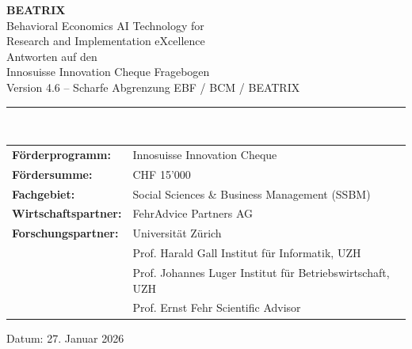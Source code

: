 \documentclass[11pt,a4paper]{article}
\begin{document}

\begin{titlepage}
\centering
\vspace*{2cm}

{\Huge\bfseries\color{fehrblue} BEATRIX}\\[0.5cm]
{\Large Behavioral Economics AI Technology for\\Research and Implementation eXcellence}\\[2cm]

{\LARGE Antworten auf den\\Innosuisse Innovation Cheque Fragebogen}\\[1cm]

{\large Version 4.6 -- Scharfe Abgrenzung EBF / BCM / BEATRIX}\\[2cm]

\rule{0.8\textwidth}{0.5pt}\\[1.5cm]

\begin{tabular}{ll}
\textbf{Förderprogramm:} & Innosuisse Innovation Cheque \\[0.3cm]
\textbf{Fördersumme:} & CHF 15'000 \\[0.3cm]
\textbf{Fachgebiet:} & Social Sciences \& Business Management (SSBM) \\[0.3cm]
\textbf{Wirtschaftspartner:} & FehrAdvice Partners AG \\[0.3cm]
\textbf{Forschungspartner:} & Universität Zürich \\[0.3cm]
& Prof. Harald Gall \quad Institut für Informatik, UZH \\
& Prof. Johannes Luger \quad Institut für Betriebswirtschaft, UZH \\
& Prof. Ernst Fehr \quad Scientific Advisor \\
\end{tabular}

\vfill


\vfill

{\large Datum: 27. Januar 2026}

\end{titlepage}
\end{document}
